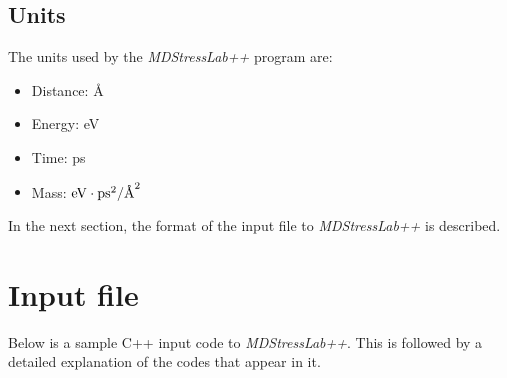 \documentclass[authoryear]{elsarticle}
\newcommand{\MDStressLab}{\emph{MDStressLab++}\xspace}
\newcommand{\angstrom}{\textup{\AA}}
\begin{document}
\subsection{Units}
The units used by the \MDStressLab program are:
\begin{itemize}
\item Distance: \angstrom
\item Energy: eV
\item Time: ps
\item Mass: $\rm{eV}\cdot\rm{ps}^2/\angstrom^2$
\end{itemize}
In the next section, the format of the input file to \MDStressLab is described.

\section{Input file}
\label{sec:input}
Below is a sample C++ input code to \MDStressLab. This is followed by a detailed explanation of the codes that appear in it.
\end{document}
